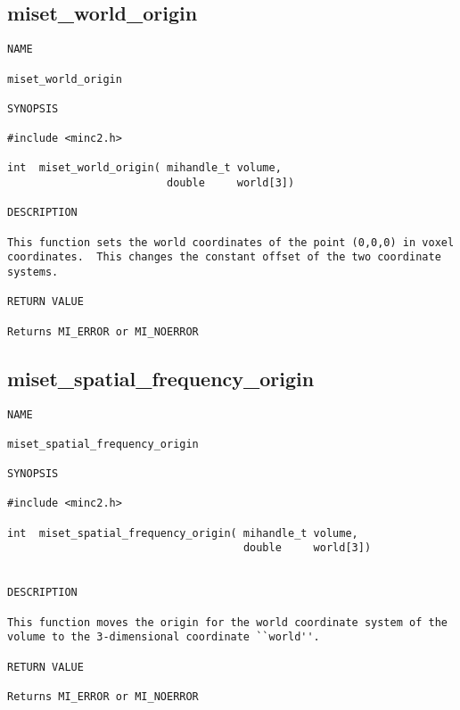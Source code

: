 \documentclass{article}
\begin{document}
\subsection{miset\_world\_origin}
\begin{verbatim}
NAME 

miset_world_origin

SYNOPSIS

#include <minc2.h>

int  miset_world_origin( mihandle_t volume,
                         double     world[3])
                       
DESCRIPTION

This function sets the world coordinates of the point (0,0,0) in voxel
coordinates.  This changes the constant offset of the two coordinate
systems.

RETURN VALUE

Returns MI_ERROR or MI_NOERROR

\end{verbatim}

\subsection{miset\_spatial\_frequency\_origin}
\begin{verbatim}
NAME 

miset_spatial_frequency_origin

SYNOPSIS

#include <minc2.h>

int  miset_spatial_frequency_origin( mihandle_t volume,
                                     double     world[3])
                       
                                
DESCRIPTION

This function moves the origin for the world coordinate system of the 
volume to the 3-dimensional coordinate ``world''.

RETURN VALUE

Returns MI_ERROR or MI_NOERROR

\end{verbatim}
\end{document}
